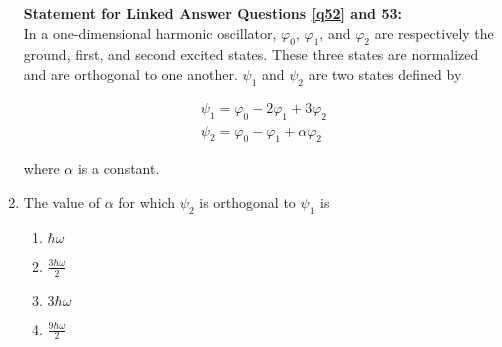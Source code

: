 \documentclass[journal]{IEEEtran}
\begin{document}
\begin{enumerate}
    \textbf{Statement for Linked Answer Questions \ref{q52} and 53:} \\
    In a one-dimensional harmonic oscillator, $\varphi_0$, $\varphi_1$, and $\varphi_2$ are respectively the
    ground, first, and second excited states. These three states are normalized and are orthogonal to one another.
    $\psi_1$ and $\psi_2$ are two states defined by

    \begin{align*}
    \psi_1 = \varphi_0 - 2\varphi_1 + 3\varphi_2 \\
    \psi_2 = \varphi_0 - \varphi_1 + \alpha\varphi_2
    \end{align*}

    where $\alpha$ is a constant.

    \item \label{q52} The value of $\alpha$ for which $\psi_2$ is orthogonal to $\psi_1$ is

    \begin{multicols}{4}
        \begin{enumerate}
            \item $\hbar\omega$
            \item $\frac{3\hbar\omega}{2}$
            \item $3\hbar\omega$
            \item $\frac{9\hbar\omega}{2}$
        \end{enumerate}
    \end{multicols}
\end{enumerate}
\end{document}
